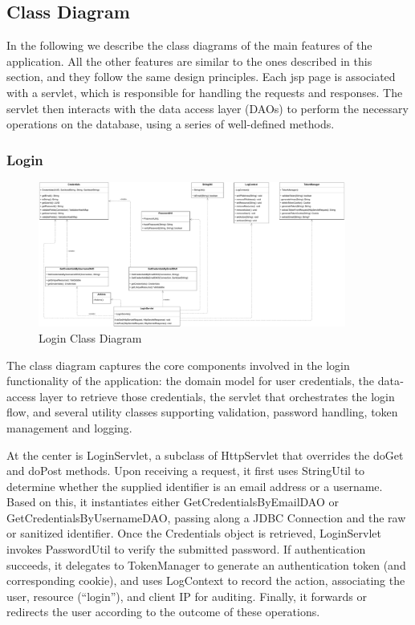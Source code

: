 \subsection{Class Diagram}

In the following we describe the class diagrams of the main features of the application. 
All the other features are similar to the ones described in this section, and they follow the same design principles.
Each jsp page is associated with a servlet, which is responsible for handling the requests and responses.
The servlet then interacts with the data access layer (DAOs) to perform the necessary operations on the database, using a series of well-defined methods.

\subsubsection{Login}
\begin{figure}[H]
    \centering
    \includegraphics[width=0.9\textwidth]{images/class_diagrams/Login_classdiagram.pdf}
    \caption{Login Class Diagram}
\end{figure}

The class diagram captures the core components involved in the login functionality of the application: the domain model for user credentials, the data‐access layer to retrieve those credentials, the servlet that orchestrates the login flow, and several utility classes supporting validation, password handling, token management and logging.

At the center is LoginServlet, a subclass of HttpServlet that overrides the doGet and doPost methods. Upon receiving a request, it first uses StringUtil to determine whether the supplied identifier is an email address or a username. Based on this, it instantiates either GetCredentialsByEmailDAO or GetCredentialsByUsernameDAO, passing along a JDBC Connection and the raw or sanitized identifier. Once the Credentials object is retrieved, LoginServlet invokes PasswordUtil to verify the submitted password. If authentication succeeds, it delegates to TokenManager to generate an authentication token (and corresponding cookie), and uses LogContext to record the action, associating the user, resource (“login”), and client IP for auditing. Finally, it forwards or redirects the user according to the outcome of these operations.

